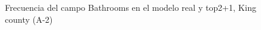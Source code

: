 \begin{figure}[H]
    \centering
    
    \caption{Frecuencia del campo Bathrooms en el modelo real y top2+1, King county (A-2)}
    \label{frecuency-top2+1-bathrooms}
\end{figure}
